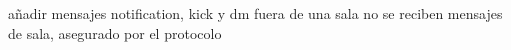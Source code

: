 añadir mensajes notification, kick y dm
fuera de una sala no se reciben mensajes de sala, asegurado por el protocolo